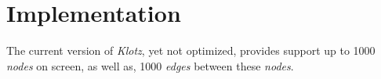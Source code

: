 \documentclass{sig-alternate}
\newcommand{\fig}[4]{
	\begin{figure}[#1]
		\centering
		\texttt{[image: \#3]}
		\caption{\label{fig:#3}#4}
	\end{figure}}
\newcommand{\seclabel}[1]{\label{sec:#1}}
\begin{document}
%
%
%
%
%
%
%
%



\section{Implementation} \seclabel{implementation}	
The current version of \emph{Klotz}, yet not optimized, provides
support up to 1000 \emph{nodes} on screen, as well as, 
1000 \emph{edges} between these \emph{nodes}.
\end{document}
